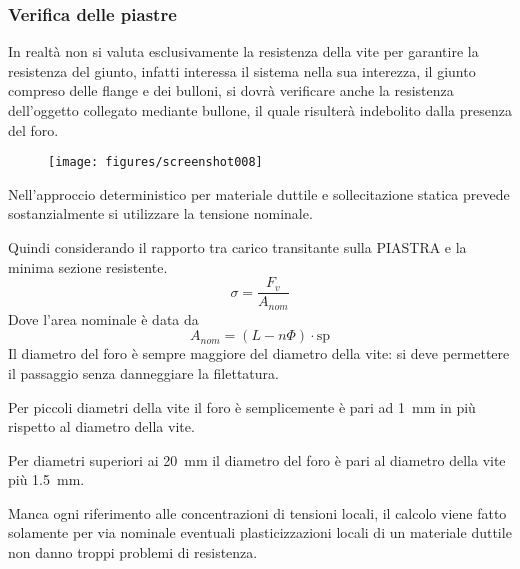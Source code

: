 \documentclass[a4paper, 15pt]{article}
\begin{document}
\subsubsection{Verifica delle piastre}
\begin{adjustwidth}{2in}{}	 		
	In realtà non si valuta esclusivamente la resistenza della vite per garantire la resistenza del giunto, infatti interessa il sistema nella sua interezza, il giunto compreso delle flange e dei bulloni, si dovrà verificare anche  la resistenza dell'oggetto collegato mediante bullone, il quale risulterà indebolito dalla presenza del foro.  
	\begin{figure}[H]
		\centering
		\texttt{[image: figures/screenshot008]}
		\label{fig:screenshot008}
	\end{figure}	
	Nell'approccio deterministico per materiale duttile e sollecitazione statica prevede sostanzialmente si utilizzare la tensione nominale. \newline 
	
	Quindi considerando il rapporto tra carico transitante sulla PIASTRA e la minima sezione resistente. 
	\[\sigma = \dfrac{F_v}{A_{nom}}\]
	Dove l'area nominale è data da 
	\[A_{nom} = (L-n\Phi)\cdot\text{sp}\]
	Il diametro del foro è sempre maggiore del diametro della vite: si deve permettere il passaggio senza danneggiare la filettatura. 
	
	Per piccoli diametri della vite il foro è semplicemente è pari ad \SI{1}{\milli\meter} in più rispetto al diametro della vite. 
	
	Per diametri superiori ai \SI{20}{\milli\meter} il diametro del foro è pari al diametro della vite più \SI{1.5}{\milli\meter}. \newline 
	
	Manca ogni riferimento alle concentrazioni di tensioni locali, il calcolo viene fatto solamente per via nominale eventuali plasticizzazioni locali di un materiale duttile non danno troppi  problemi di resistenza. 
\end{adjustwidth}
\newpage
\end{document}

